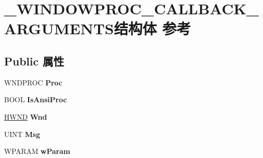 \hypertarget{struct___w_i_n_d_o_w_p_r_o_c___c_a_l_l_b_a_c_k___a_r_g_u_m_e_n_t_s}{}\section{\+\_\+\+W\+I\+N\+D\+O\+W\+P\+R\+O\+C\+\_\+\+C\+A\+L\+L\+B\+A\+C\+K\+\_\+\+A\+R\+G\+U\+M\+E\+N\+T\+S结构体 参考}
\label{struct___w_i_n_d_o_w_p_r_o_c___c_a_l_l_b_a_c_k___a_r_g_u_m_e_n_t_s}
\subsection*{Public 属性}
\begin{DoxyCompactItemize}
\item 
\mbox{\label{struct___w_i_n_d_o_w_p_r_o_c___c_a_l_l_b_a_c_k___a_r_g_u_m_e_n_t_s_ac60ce4d49b063472cb814d68f667cdc5}} 
W\+N\+D\+P\+R\+OC {\bfseries Proc}
\item 
\mbox{\label{struct___w_i_n_d_o_w_p_r_o_c___c_a_l_l_b_a_c_k___a_r_g_u_m_e_n_t_s_a44360c5b8d4485b87bcc8a7a7f668c52}} 
B\+O\+OL {\bfseries Is\+Ansi\+Proc}
\item 
\mbox{\label{struct___w_i_n_d_o_w_p_r_o_c___c_a_l_l_b_a_c_k___a_r_g_u_m_e_n_t_s_a1cc209f4885b985ca1c46480c28941a6}} 
\hyperlink{interfacevoid}{H\+W\+ND} {\bfseries Wnd}
\item 
\mbox{\label{struct___w_i_n_d_o_w_p_r_o_c___c_a_l_l_b_a_c_k___a_r_g_u_m_e_n_t_s_ab5cd63e9f6674ef78bc1aad7e9401770}} 
U\+I\+NT {\bfseries Msg}
\item 
\mbox{\label{struct___w_i_n_d_o_w_p_r_o_c___c_a_l_l_b_a_c_k___a_r_g_u_m_e_n_t_s_aa3965106e3325eeea19b1bf62d32b6b8}} 
W\+P\+A\+R\+AM {\bfseries w\+Param}
\item 
\mbox{\label{struct___w_i_n_d_o_w_p_r_o_c___c_a_l_l_b_a_c_k___a_r_g_u_m_e_n_t_s_afeaba4d85a574fb5440dcd2a8d112a48}} 

\end{DoxyCompactItemize}
